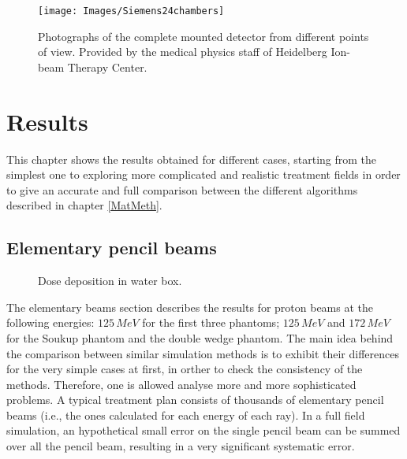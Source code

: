\documentclass[12pt, a4paper, twoside]{book}
\begin{document}
\begin{figure}[b]
{\texttt{[image: Images/Siemens24chambers]}}
\caption{Photographs of the complete mounted detector from different points of view. Provided by the medical physics staff of Heidelberg Ion-beam Therapy Center.}
\label{fig:24cham}
\end{figure}




\chapter{Results} \label{res}%
\label{chap:res}

This chapter shows the results obtained for different cases, starting from the simplest one to exploring more complicated and realistic treatment fields in order to give an accurate and full comparison between the different algorithms described in chapter \ref{MatMeth}. 

\section{Elementary pencil beams}


\begin{figure}[!h]
\centering
{}\quad
{}\quad
{}\quad
\caption{Dose deposition in water box.}
\label{fig:WB1}
\end{figure}
The elementary beams section describes the results for proton beams at the following energies: $125\,MeV$ for the first three phantoms; $125\,MeV$ and $172\,MeV$ for the Soukup phantom and the double wedge phantom.
The main idea behind the comparison between similar simulation methods is to exhibit their differences for the very simple cases at first, in orther to check the consistency of the methods. Therefore, one is allowed analyse more and more sophisticated problems. 
A typical treatment plan consists of thousands of elementary pencil beams (i.e., the ones calculated for each energy of each ray). In a full field simulation, an hypothetical small error on the single pencil beam can be summed over all the pencil beam, resulting in a very significant systematic error.
\end{document}
